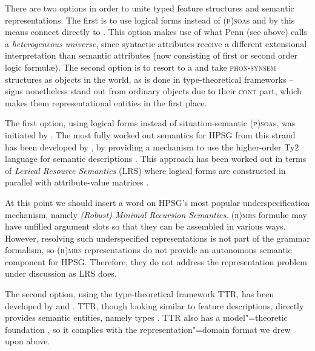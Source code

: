 \documentclass[output=paper,biblatex,babelshorthands,newtxmath,draftmode,colorlinks,citecolor=brown]{langscibook}
\begin{document}
There are two options in order to unite typed feature structures and semantic representations.
%
The first is to use logical forms instead of \textsc{(p)soa}s and by this means connect directly to .
%
This option makes use of what Penn (see above) calls a \emph{heterogeneous universe}, since syntactic attributes receive a different extensional interpretation than  semantic attributes (now consisting of first or second order logic formul{\ae}).
%
The second option is to resort to a  and take \textsc{phon-synsem} structures as objects in the world, as is done in type-theoretical frameworks -- signs nonetheless stand out from ordinary objects due to their \textsc{cont} part, which makes them representational entities in the first place.



The first option, using logical forms instead of situation-semantic \textsc{(p)soa}s, was initiated by \citet{Nerbonne:1992}. 
%
The most fully worked out semantics for HPSG from this strand has been developed by \citeauthor{Richter:Sailer:1999:a}, by providing a mechanism to use the higher-order Ty2 language for semantic descriptions \citep{Richter:Sailer:1999:a}.
%
This approach has been worked out in terms of \emph{Lexical Resource Semantics} (LRS)\indexlrs %
where logical forms are constructed in parallel with attribute-value matrices \citep{Richter:Sailer:04}.


At this point we should insert a word on HPSG's most popular underspecification mechanism, namely \emph{(Robust) Minimal Recursion Semantics}\indexmrs \citep*{Copestake:Flickinger:Pollard:Sag:2005,Copestake:2007}.
%
\textsc{(r)mrs} formul{\ae} may have unfilled argument slots so that they can be assembled in various ways.
%
However, resolving such underspecified representations is not part of the grammar formalism, so \textsc{(r)mrs} representations do not provide an autonomous semantic component for HPSG.
%
Therefore, they do not address the representation problem under discussion as LRS does. 


The second option, using the type-theoretical framework TTR, has been developed by \citet{Cooper:2008,Cooper:2014:a,Cooper:ms} and \citet{Ginzburg:2012}.
%
TTR, though looking similar to feature descriptions, directly provides semantic entities, namely types \citep[Sec.~5.2.2]{Ginzburg:2012}.
%
TTR also has a model"=theoretic foundation \citep{Cooper:ms}, so it complies with the representation"=domain format we drew upon above.
\end{document}
